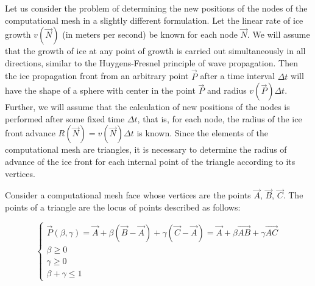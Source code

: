 \documentclass[
11pt,%
tightenlines,%
twoside,%
onecolumn,%
nofloats,%
nobibnotes,%
nofootinbib,%
superscriptaddress,%
noshowpacs,%
centertags]%
{revtex4-2}
\begin{document}
Let us consider the problem of determining the new positions of the nodes of the computational mesh in a slightly different formulation.
Let the linear rate of ice growth $v(\vec{N})$ (in meters per second) be known for each node $\vec{N}$.
We will assume that the growth of ice at any point of growth is carried out simultaneously in all directions, similar to the Huygens-Fresnel principle of wave propagation.
Then the ice propagation front from an arbitrary point $\vec{P}$ after a time interval $\Delta t$ will have the shape of a sphere with center in the point $\vec{P}$ and radius $v(\vec{P}) \Delta t$.
Further, we will assume that the calculation of new positions of the nodes is performed after some fixed time $\Delta t$, that is, for each node, the radius of the ice front advance $R(\vec{N}) = v(\vec{N}) \Delta t$ is known.
Since the elements of the computational mesh are triangles, it is necessary to determine the radius of advance of the ice front for each internal point of the triangle according to its vertices.

Consider a computational mesh face whose vertices are the points $\vec{A}$, $\vec{B}$, $\vec{C}$.
The points of a triangle are the locus of points described as follows:

\begin{equation}
\begin{cases}
\vec{P}(\beta, \gamma) = \vec{A} + \beta (\vec{B} - \vec{A}) + \gamma (\vec{C} - \vec{A}) = \vec{A} + \beta \vec{AB} + \gamma \vec{AC} \\
\beta \ge 0 \\
\gamma \ge 0 \\
\beta + \gamma \le 1
\end{cases}
\end{equation}
\end{document}
